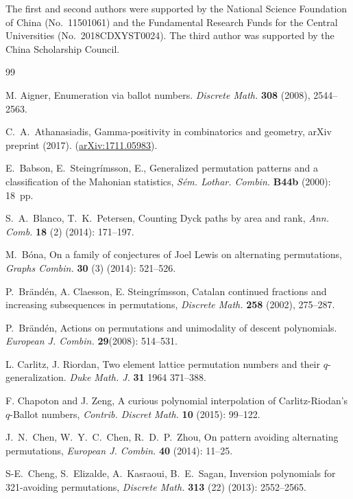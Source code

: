 \documentclass[12pt,reqno]{amsart}
\numberwithin{equation}{section}
\theoremstyle{plain}
\theoremstyle{definition}
\begin{document}
The first and second authors were supported by the National Science Foundation of China (No.~11501061) and the Fundamental Research Funds for the Central Universities (No.~2018CDXYST0024). The third author was supported by the China Scholarship Council.



\begin{thebibliography}{99}


 M. Aigner, Enumeration via ballot numbers. \textit{Discrete Math.} {\bf 308} (2008), 2544--2563.

 C.~A.~Athanasiadis, Gamma-positivity in combinatorics and geometry, arXiv preprint (2017). (\href{http://arxiv.org/abs/1711.05983}{arXiv:1711.05983}).

 E.~Babson, E.~Steingr\'imsson, E., Generalized permutation patterns and a classification of the Mahonian statistics, \textit{S\'em. Lothar. Combin.} {\bf B44b} (2000): 18~pp.




 S.~A.~Blanco, T.~K.~Petersen, Counting Dyck paths by area and rank, \textit{Ann. Comb.} {\bf 18} (2) (2014): 171--197.

 M.~B\'ona, On a family of conjectures of Joel Lewis on alternating permutations, \textit{Graphs Combin.} {\bf 30} (3) (2014): 521--526.

 P.~Br\"{a}nd\'{e}n, A. Claesson, E. Steingr\'{i}msson,
Catalan continued fractions and increasing subsequences in permutations, \textit{Discrete Math.} {\bf 258} (2002), 275--287.

 P.~Br\"{a}nd\'{e}n, Actions on permutations and unimodality of descent polynomials. \textit{European J. Combin.} {\bf 29}(2008): 514--531.

L. Carlitz, J.  Riordan, Two element lattice permutation numbers and their $q$-generalization. \textit{Duke Math. J.} {\bf 31} 1964 371--388.

F. Chapoton and J. Zeng, A curious polynomial interpolation of Carlitz-Riodan's $q$-Ballot numbers, \textit{Contrib. Discret Math.} {\bf 10} (2015): 99--122.

 J.~N.~Chen, W.~Y.~C.~Chen, R.~D.~P.~Zhou, On pattern avoiding alternating permutations, \textit{European J. Combin.} {\bf 40} (2014): 11--25.

 S-E.~Cheng, S.~Elizalde, A.~Kasraoui, B.~E.~Sagan, Inversion polynomials for 321-avoiding permutations, \textit{Discrete Math.} {\bf 313} (22) (2013): 2552--2565.


\end{thebibliography}
\end{document}
